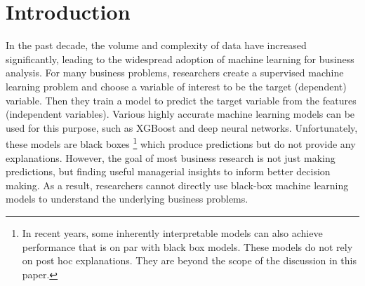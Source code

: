 \documentclass[12pt]{article}    %
\begin{document}

\section*{Introduction}




In the past decade, the volume and complexity of data have increased significantly, leading to the widespread adoption of machine learning for business analysis. For many business problems, researchers create a supervised machine learning problem and choose a variable of interest to be the target (dependent) variable. Then they train a model to predict the target variable from the features (independent variables). Various highly accurate machine learning models can be used for this purpose, such as XGBoost and deep neural networks. Unfortunately, these models are black boxes \footnote{In recent years, some inherently interpretable models can also achieve performance that is on par with black box models. These models do not rely on post hoc explanations. They are beyond the scope of the discussion in this paper.} which produce predictions but do not provide any explanations. 
However, the goal of most business research is not just making predictions, but finding useful managerial insights to inform better decision making. %
As a result, researchers cannot directly use black-box machine learning models to understand the underlying business problems.
\end{document}
